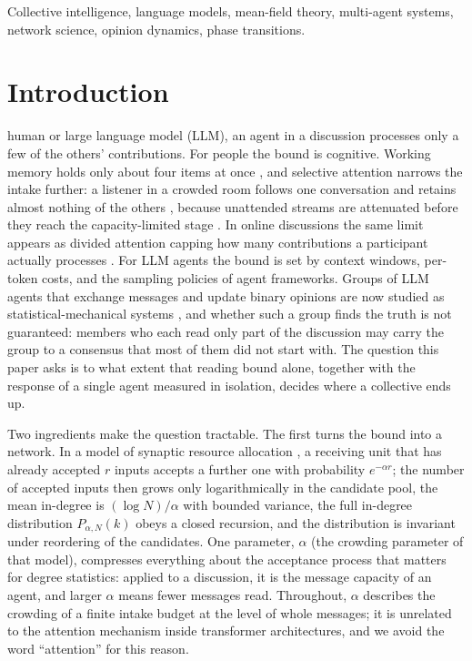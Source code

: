 \documentclass{ieeeaccess}
\begin{document}
\begin{keywords}
Collective intelligence, language models, mean-field theory, multi-agent systems, network science, opinion dynamics, phase transitions.
\end{keywords}

\titlepgskip=-21pt

\maketitle

\section{Introduction}\label{sec:intro}

 human or large language model (LLM), an agent in a discussion
processes only a few of the others' contributions. For people the bound is
cognitive. Working memory holds only about four items at once
\cite{Cowan2001,LuckVogel1997}, and selective attention narrows the intake
further: a listener in a crowded room follows one conversation and retains
almost nothing of the others \cite{Cherry1953}, because unattended streams
are attenuated before they reach the capacity-limited stage
\cite{Treisman1964}. In online discussions the same limit appears as
divided attention capping how many contributions a participant actually
processes \cite{HodasLerman2012}. For LLM agents the bound is set by
context windows, per-token costs, and the sampling policies of agent
frameworks.
Groups of LLM agents that exchange messages and update binary opinions are
now studied as statistical-mechanical systems \cite{El2026}, and whether
such a group finds the truth is not guaranteed: members who each read only
part of the discussion may carry the group to a consensus that most of them
did not start with. The question this paper
asks is to what extent that reading bound alone, together with the response
of a single agent measured in isolation, decides where a collective ends up.

Two ingredients make the question tractable. The first turns the bound into
a network. In a model of synaptic resource allocation \cite{SciRepCrowding},
a receiving unit that has already accepted $r$ inputs accepts a further one
with probability $e^{-\alpha r}$; the number of accepted inputs then grows
only logarithmically in the candidate pool, the mean in-degree is
$(\log N)/\alpha$ with bounded variance, the full in-degree distribution
$P_{\alpha,N}(k)$ obeys a closed recursion, and the distribution is
invariant under reordering of the candidates. One parameter, $\alpha$ (the
crowding parameter of that model), compresses everything about the acceptance process that matters for degree
statistics: applied to a discussion, it is the message capacity of an agent,
and larger $\alpha$ means fewer messages read. Throughout, $\alpha$
describes the crowding of a finite intake budget at the level of whole
messages; it is unrelated to the attention mechanism inside transformer
architectures, and we avoid the word ``attention'' for this reason.
\end{document}
